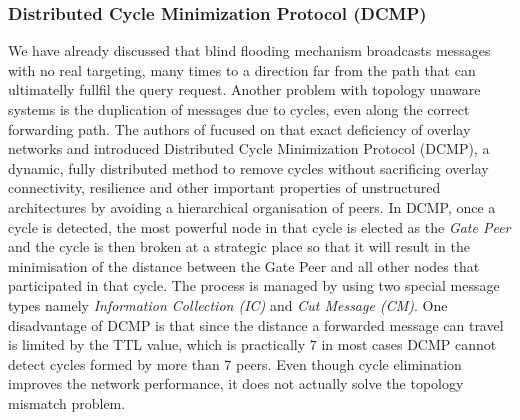 %
%

\subsubsection{Distributed Cycle Minimization Protocol (DCMP)}
We have already discussed that blind flooding mechanism broadcasts messages with
no real targeting, many times to a direction far from the path that can
ultimatelly fullfil the query request. Another problem with topology unaware
systems is the duplication of messages due to cycles, even along the correct
forwarding path. The authors of \cite{zhu_dcmp_2008} fucused on that exact
deficiency of overlay networks and introduced Distributed Cycle Minimization
Protocol (DCMP), a dynamic, fully distributed method to remove cycles without
sacrificing overlay connectivity, resilience and other important properties of
unstructured architectures by avoiding a hierarchical organisation of peers. In
DCMP, once a cycle is detected, the most powerful node in that cycle is
elected as the \emph{Gate Peer} and the cycle is then broken at a strategic
place so that it will result in the minimisation of the distance between the
Gate Peer and all other nodes that participated in that cycle. The process
is managed by using two special message types namely \emph{Information
Collection (IC)} and \emph{Cut Message (CM)}. One disadvantage of DCMP is that
since the distance a forwarded message can travel is limited by the TTL value,
which is practically $7$ in most cases DCMP cannot detect cycles formed by more
than 7 peers. Even though cycle elimination improves the network performance, it
does not actually solve the topology mismatch problem.

